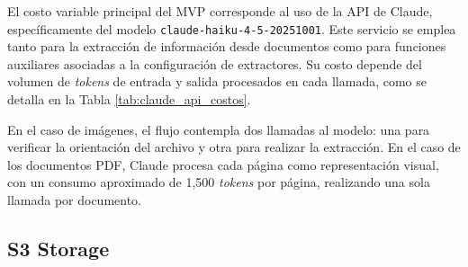 El costo variable principal del MVP corresponde al uso de la API de Claude, específicamente del modelo \texttt{claude-haiku-4-5-20251001}. Este servicio se emplea tanto para la extracción de información desde documentos como para funciones auxiliares asociadas a la configuración de extractores. Su costo depende del volumen de \textit{tokens} de entrada y salida procesados en cada llamada, como se detalla en la Tabla \ref{tab:claude_api_costos}.
\begin{table}[H]
\centering
{}
\caption{Costos de procesamiento con Claude API}
\label{tab:claude_api_costos}
\end{table}
En el caso de imágenes, el flujo contempla dos llamadas al modelo: una para verificar la orientación del archivo y otra para realizar la extracción. En el caso de los documentos PDF, Claude procesa cada página como representación visual, con un consumo aproximado de 1{,}500 \textit{tokens} por página, realizando una sola llamada por documento. 

\subsection{S3 Storage}

